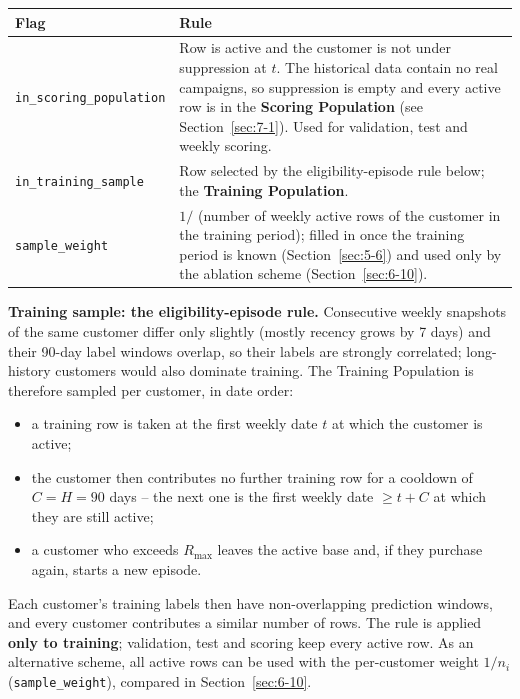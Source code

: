 \begin{center}
\begin{tabular}{@{}p{4.6cm}p{9.5cm}@{}}
    \toprule
    Flag & Rule \\
    \midrule
    \texttt{in\_scoring\_population} & Row is active and the customer is not under suppression at $t$. The historical data contain no real campaigns, so suppression is empty and every active row is in the \textbf{Scoring Population} (see Section~\ref{sec:7-1}). Used for validation, test and weekly scoring. \\
    \texttt{in\_training\_sample} & Row selected by the eligibility-episode rule below; the \textbf{Training Population}. \\
    \texttt{sample\_weight} & $1 /$ (number of weekly active rows of the customer in the training period); filled in once the training period is known (Section~\ref{sec:5-6}) and used only by the ablation scheme (Section~\ref{sec:6-10}). \\
    \bottomrule
\end{tabular}
\end{center}

\textbf{Training sample: the eligibility-episode rule.} Consecutive weekly snapshots of the same customer differ only slightly (mostly recency grows by 7 days) and their 90-day label windows overlap, so their labels are strongly correlated; long-history customers would also dominate training. The Training Population is therefore sampled per customer, in date order:
\begin{itemize}
    \item a training row is taken at the first weekly date $t$ at which the customer is active;
    \item the customer then contributes no further training row for a cooldown of $C = H = 90$ days -- the next one is the first weekly date $\geq t + C$ at which they are still active;
    \item a customer who exceeds $R_{\max}$ leaves the active base and, if they purchase again, starts a new episode.
\end{itemize}
Each customer's training labels then have non-overlapping prediction windows, and every customer contributes a similar number of rows. The rule is applied \textbf{only to training}; validation, test and scoring keep every active row. As an alternative scheme, all active rows can be used with the per-customer weight $1/n_i$ (\texttt{sample\_weight}), compared in Section~\ref{sec:6-10}.

